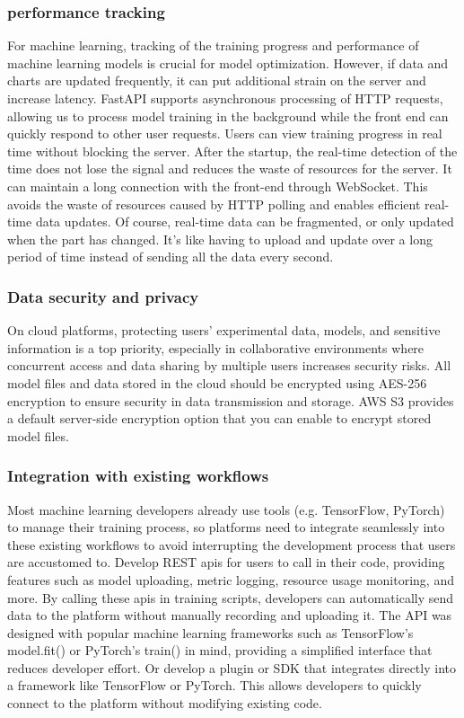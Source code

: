 \documentclass[12pt]{article}
\begin{document}
\subsubsection{performance tracking}
For machine learning, tracking of the training progress and performance of machine learning models is crucial for model optimization. However, if data and charts are updated frequently, it can put additional strain on the server and increase latency. FastAPI supports asynchronous processing of HTTP requests, allowing us to process model training in the background while the front end can quickly respond to other user requests. Users can view training progress in real time without blocking the server. After the startup, the real-time detection of the time does not lose the signal and reduces the waste of resources for the server. It can maintain a long connection with the front-end through WebSocket. This avoids the waste of resources caused by HTTP polling and enables efficient real-time data updates. Of course, real-time data can be fragmented, or only updated when the part has changed. It's like having to upload and update over a long period of time instead of sending all the data every second.
\subsubsection{Data security and privacy}
On cloud platforms, protecting users' experimental data, models, and sensitive information is a top priority, especially in collaborative environments where concurrent access and data sharing by multiple users increases security risks. All model files and data stored in the cloud should be encrypted using AES-256 encryption to ensure security in data transmission and storage. AWS S3 provides a default server-side encryption option that you can enable to encrypt stored model files.
\subsubsection{Integration with existing workflows}
Most machine learning developers already use tools (e.g. TensorFlow, PyTorch) to manage their training process, so platforms need to integrate seamlessly into these existing workflows to avoid interrupting the development process that users are accustomed to. Develop REST apis for users to call in their code, providing features such as model uploading, metric logging, resource usage monitoring, and more. By calling these apis in training scripts, developers can automatically send data to the platform without manually recording and uploading it.
The API was designed with popular machine learning frameworks such as TensorFlow's model.fit() or PyTorch's train() in mind, providing a simplified interface that reduces developer effort. Or develop a plugin or SDK that integrates directly into a framework like TensorFlow or PyTorch. This allows developers to quickly connect to the platform without modifying existing code.
\end{document}
